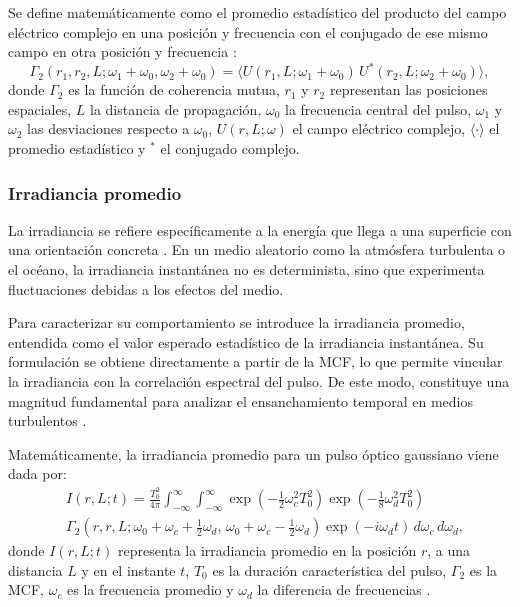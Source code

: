 Se define matemáticamente como el promedio estadístico del producto del campo eléctrico complejo en una posición y frecuencia con el conjugado de ese mismo campo en otra posición y frecuencia \cite{Ronald}:
\begin{equation}
\Gamma_{2}(r_{1}, r_{2}, L; \omega_{1} + \omega_{0}, \omega_{2} + \omega_{0}) = 
\langle U(r_{1}, L; \omega_{1} + \omega_{0}) \, U^{*}(r_{2}, L; \omega_{2} + \omega_{0}) \rangle,
\end{equation}
donde $\Gamma_{2}$ es la función de coherencia mutua, $r_{1}$ y $r_{2}$ representan las posiciones espaciales, $L$ la distancia de propagación, $\omega_{0}$ la frecuencia central del pulso, $\omega_{1}$ y $\omega_{2}$ las desviaciones respecto a $\omega_{0}$, $U(r, L; \omega)$ el campo eléctrico complejo, $\langle \cdot \rangle$ el promedio estadístico y $^{*}$ el conjugado complejo.

\subsubsection{Irradiancia promedio}
La irradiancia se refiere específicamente a la energía que llega a una superficie con una orientación concreta \cite{Paschotta}. En un medio aleatorio como la atmósfera turbulenta o el océano, la irradiancia instantánea no es determinista, sino que experimenta fluctuaciones debidas a los efectos del medio.

Para caracterizar su comportamiento se introduce la irradiancia promedio, entendida como el valor esperado estadístico de la irradiancia instantánea. Su formulación se obtiene directamente a partir de la MCF, lo que permite vincular la irradiancia con la correlación espectral del pulso. De este modo, constituye una magnitud fundamental para analizar el ensanchamiento temporal en medios turbulentos \cite{Ronald}.

Matemáticamente, la irradiancia promedio para un pulso óptico gaussiano viene dada por:
\begin{equation}
\begin{aligned}
&I(r, L; t) = \frac{T_0^2}{4\pi} \int_{-\infty}^\infty \int_{-\infty}^\infty 
 \exp\left(-\frac{1}{2} \omega_c^2 T_0^2 \right)
\exp\left( -\frac{1}{8} \omega_d^2 T_0^2 \right) \\
& \Gamma_2\left(r, r, L; \omega_0 + \omega_c + \frac{1}{2}\omega_d,\, \omega_0 + \omega_c - \frac{1}{2}\omega_d\right)
\exp(-i\omega_d t)\, d\omega_c\, d\omega_d,
\end{aligned}
\end{equation}
donde $I(r, L; t)$ representa la irradiancia promedio en la posición $r$, a una distancia $L$ y en el instante $t$, $T_0$ es la duración característica del pulso, $\Gamma_2$ es la MCF, $\omega_c$ es la frecuencia promedio y $\omega_d$ la diferencia de frecuencias \cite{Phillips}.





\chapterend{}
